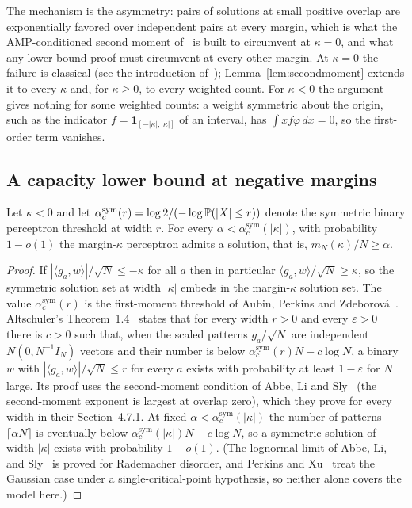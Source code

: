 The mechanism is the asymmetry: pairs of solutions at small positive
overlap are exponentially favored over independent pairs at every
margin, which is what the AMP-conditioned second moment
of~\cite{ding2019capacity} is built to circumvent at $\kappa=0$, and
what any lower-bound proof must circumvent at every other margin.
At $\kappa=0$ the failure is classical (see the introduction
of~\cite{ding2019capacity}); Lemma~\ref{lem:secondmoment} extends it
to every $\kappa$ and, for $\kappa\ge0$, to every weighted count.  For $\kappa<0$ the argument gives nothing for some weighted counts: a
weight symmetric about the origin, such as the indicator
$f=\mathbf 1_{[-|\kappa|,|\kappa|]}$ of an interval, has
$\int xf\varphi\,dx=0$, so the first-order term vanishes.

\subsection{A capacity lower bound at negative margins}

\begin{prop}\label{prop:embedded}
Let $\kappa<0$ and let $\alpha^{\mathrm{sym}}_c(r)=
\log2/(-\log\mathbb{P}(|X|\le r))$ denote the symmetric binary perceptron
threshold at width $r$.  For every
$\alpha<\alpha^{\mathrm{sym}}_c(|\kappa|)$, with probability
$1-o(1)$ the margin-$\kappa$ perceptron admits a solution, that is,
$m_N(\kappa)/N\ge\alpha$.
\end{prop}

\begin{proof}
If $|\langle g_a,w\rangle|/\sqrt N\le-\kappa$ for all $a$ then in
particular $\langle g_a,w\rangle/\sqrt N\ge\kappa$, so the symmetric
solution set at width $|\kappa|$ embeds in the margin-$\kappa$
solution set.  The value $\alpha^{\mathrm{sym}}_c(r)$ is the
first-moment threshold of Aubin, Perkins and
Zdeborov\'a~\cite{aubin2019storage}.  Altschuler's
Theorem~1.4~\cite{altschuler2022} states that for every width $r>0$
and every $\varepsilon>0$ there is $c>0$ such that, when the scaled patterns
$g_a/\sqrt N$ are independent $N(0,N^{-1}I_N)$ vectors and their
number is below $\alpha^{\mathrm{sym}}_c(r)N-c\log N$, a binary $w$
with $|\langle g_a,w\rangle|/\sqrt N\le r$ for every $a$ exists with
probability at least $1-\varepsilon$ for $N$ large.  Its proof uses the second-moment
condition of Abbe, Li and Sly~\cite[Lemma~3.4]{abbelisly2021} (the
second-moment exponent is largest at overlap zero), which they prove
for every width in their Section~4.7.1.  At fixed
$\alpha<\alpha^{\mathrm{sym}}_c(|\kappa|)$ the number of patterns $\lceil\alpha N\rceil$ is
eventually below $\alpha^{\mathrm{sym}}_c(|\kappa|)N-c\log N$, so a
symmetric solution of width $|\kappa|$ exists with probability
$1-o(1)$.  (The lognormal limit of Abbe, Li,
and Sly~\cite{abbelisly2021} is proved for Rademacher disorder, and
Perkins and Xu~\cite{perkinsxu2021} treat the Gaussian case under a
single-critical-point hypothesis, so neither alone covers the model
here.)
\end{proof}

